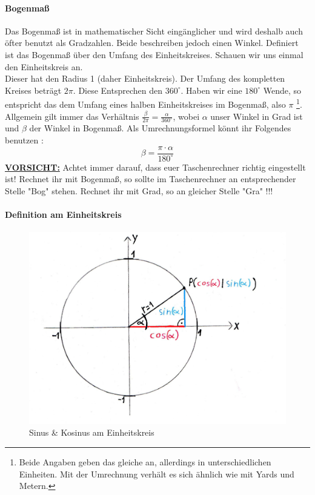 	\paragraph{Bogenmaß}
Das Bogenmaß ist in mathematischer Sicht eingänglicher und wird deshalb auch öfter benutzt als Gradzahlen. Beide beschreiben jedoch einen Winkel. Definiert ist das Bogenmaß über den Umfang des Einheitskreises. Schauen wir uns einmal den Einheitskreis an.\\
Dieser hat den Radius 1 (daher Einheitskreis). Der Umfang des kompletten Kreises beträgt \(2\pi\). Diese Entsprechen den \(360^\circ\). Haben wir eine \(180^\circ\) Wende, so entspricht das dem Umfang eines halben Einheitskreises im Bogenmaß, also \(\pi\) \footnote{Beide Angaben geben das gleiche an, allerdings in unterschiedlichen Einheiten. Mit der Umrechnung verhält es sich ähnlich wie mit Yards und Metern.}. Allgemein gilt immer das Verhältnis \(\frac{\beta}{2\pi}=\frac{\alpha}{360^\circ}\), wobei \(\alpha\) unser Winkel in Grad ist und \(\beta\) der Winkel in Bogenmaß. Als Umrechnungsformel könnt ihr Folgendes benutzen :
\[\beta=\frac{\pi \cdot \alpha}{180^\circ}\]
\underline{\textbf{VORSICHT:}} Achtet immer darauf, dass euer Taschenrechner richtig eingestellt ist! Rechnet ihr mit Bogenmaß, so sollte im Taschenrechner an entsprechender Stelle "Bog" stehen. Rechnet ihr mit Grad, so an gleicher Stelle "Gra" !!!
	\paragraph{Definition am Einheitskreis}
	   
   \begin{figure}[h]
   \centering
   \includegraphics[scale=0.2]{Images/Einheitskreis.jpeg}
   \caption{Sinus \& Kosinus am Einheitskreis}
   \end{figure}
  
